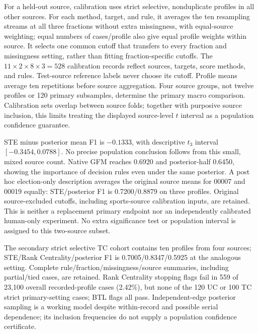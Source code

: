 For a held-out source, calibration uses strict selective, nonduplicate profiles in all other sources. For each method, target, and rule, it averages the ten resampling streams at all three fractions without extra missingness, with equal-source weighting; equal numbers of cases/profile also give equal profile weights within source. It selects one common cutoff that transfers to every fraction and missingness setting, rather than fitting fraction-specific cutoffs. The $11\times2\times8\times3=528$ calibration records reflect sources, targets, score methods, and rules. Test-source reference labels never choose its cutoff. Profile means average ten repetitions before source aggregation. Four source groups, not twelve profiles or 120 primary subsamples, determine the primary macro comparison. Calibration sets overlap between source folds; together with purposive source inclusion, this limits treating the displayed source-level $t$ interval as a population confidence guarantee.

\begin{table}[ht]\centering\small

\caption{Primary UC F1 by held-out source; STE and posterior both use absolute source-excluded calibration. Sources 00007/00019 are elections; 00049/00053 are sports lap rankings. Every source favors posterior. These four purposively assembled clusters limit population inference.}
\label{tab:gpu-real-sources}\end{table}

STE minus posterior mean F1 is $-0.1333$, with descriptive $t_3$ interval $[-0.3454,0.0788]$. No precise population conclusion follows from this small, mixed source count. Native GFM reaches 0.6920 and posterior-half 0.6450, showing the importance of decision rules even under the same posterior. A post hoc election-only description averages the original source means for 00007 and 00019 equally: STE/posterior F1 is 0.7200/0.8879 on three profiles. Original source-excluded cutoffs, including sports-source calibration inputs, are retained. This is neither a replacement primary endpoint nor an independently calibrated human-only experiment. No extra significance test or population interval is assigned to this two-source subset.

The secondary strict selective TC cohort contains ten profiles from four sources; STE/Rank Centrality/posterior F1 is 0.7005/0.8347/0.5925 at the analogous setting. Complete rule/fraction/missingness/source summaries, including partial/tied cases, are retained. Rank Centrality stopping flags fail in 559 of 23,100 overall recorded-profile cases (2.42\%), but none of the 120 UC or 100 TC strict primary-setting cases; BTL flags all pass. Independent-edge posterior sampling is a working model despite within-record and possible serial dependence; its inclusion frequencies do not supply a population confidence certificate.

